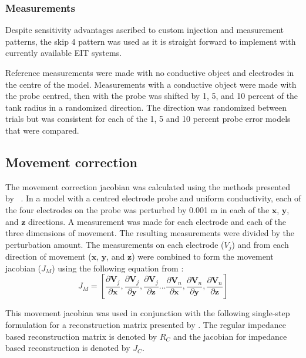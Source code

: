 \subsubsection{Measurements}
Despite sensitivity advantages ascribed to custom injection and 
measurement patterns, the skip 4 pattern was used as it 
is straight forward to implement with currently available EIT systems. 

Reference measurements were made with no conductive object and 
electrodes in the centre of the model. Measurements with a conductive object were made 
with the probe centred, then
with the probe was shifted by 1, 5, and 10 percent of the tank radius in a randomized 
direction. The direction was randomized between trials but was consistent for 
each of the 1, 5 and 10 percent probe error models that were compared. 

\subsection{Movement correction}
\label{sec:3_methods}

The movement correction jacobian was calculated using the methods presented by
~. In a model with a centred electrode
probe and uniform conductivity, each of the four electrodes on the probe was
perturbed by 0.001 m in each of the $\mathbf x$, $\mathbf y$, 
and $\mathbf z$ directions. A measurement was made for 
each electrode and each of the three dimensions of movement. 
The resulting measurements were divided by the perturbation 
amount. 
The measurements on each electrode ($V_j$) and from each  direction 
of movement ($\mathbf x$, $\mathbf y$, 
and $\mathbf z$) were combined to form the movement 
jacobian ($J_M$) using the following equation from
:
\begin{equation}
	J_M = \left[ 
		  \frac{\partial\mathbf{V}_j}{\partial\mathbf{x}},
		  \frac{\partial\mathbf{V}_j}{\partial\mathbf{y}},
	      \frac{\partial\mathbf{V}_j}{\partial\mathbf{z}} ... 
		  \frac{\partial\mathbf{V}_n}{\partial\mathbf{x}},
		  \frac{\partial\mathbf{V}_n}{\partial\mathbf{y}},
	      \frac{\partial\mathbf{V}_n}{\partial\mathbf{z}} 
		  \right]
\end{equation}

This movement jacobian was used in conjunction with the following single-step 
formulation for a reconstruction matrix presented 
by . The regular impedance based 
reconstruction matrix is denoted by $R_C$ and the jacobian for impedance based 
reconstruction is denoted by $J_C$.

